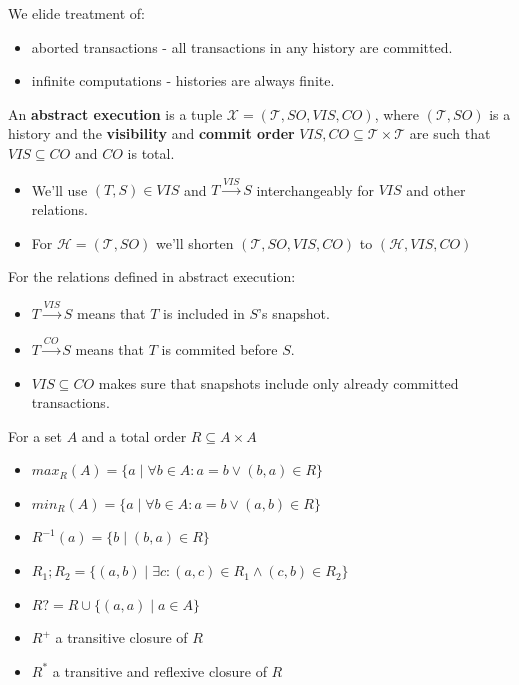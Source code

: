 \documentclass{beamer}
\begin{document}
\begin{frame}
	We elide treatment of:
	\begin{itemize}
		\item aborted transactions - all transactions in any history are committed.
		\item infinite computations - histories are always finite.
	\end{itemize}
\end{frame}

\begin{frame}
	An \textbf{abstract execution} is a tuple $ \mathcal{X} = (\mathcal{T}, SO, VIS, CO) $, where $(\mathcal{T}, SO)$ is a history and the \textbf{visibility} and \textbf{commit order} $ VIS, CO \subseteq \mathcal{T} \times \mathcal{T} $ are such that $ VIS \subseteq CO $ and $CO$ is total.
\end{frame}

\begin{frame}
	\begin{itemize}
		\item We'll use $ (T, S) \in VIS$ and $ T \overset{VIS}{\longrightarrow} S $ interchangeably for $VIS$ and other relations.
		\item For $\mathcal{H}=(\mathcal{T}, SO)$ we'll shorten $(\mathcal{T}, SO, VIS, CO)$ to $(\mathcal{H}, VIS, CO)$
	\end{itemize}
\end{frame}

\begin{frame}
	For the relations defined in abstract execution:
	\begin{itemize}
		\item $ T \overset{VIS}{\longrightarrow} S $ means that $T$ is included in $S$'s snapshot.
		\item $ T \overset{CO}{\longrightarrow} S $ means that $T$ is commited before $S$.
		\item $ VIS \subseteq CO $ makes sure that snapshots include only already committed transactions.
	\end{itemize}
\end{frame}

\begin{frame}
	For a set $ A $ and a total order $ R \subseteq A \times A $
	\begin{itemize}
		\item $max_R(A) = \{ a \mid \forall b \in A: a = b \vee (b, a) \in R \} $
		\item $min_R(A) = \{ a \mid \forall b \in A: a = b \vee (a, b) \in R \} $
		\item $R^{-1}(a) = \{ b \mid  (b, a) \in R\} $
		\item $R_1;R_2 = \{(a,b) \mid \exists c: (a,c) \in R_1 \wedge (c,b) \in R_2\} $
		\item $R? = R \cup \{ (a, a) \mid a \in A \}$
		\item $R^+$ a transitive closure of $R$
		\item $R^*$ a transitive and reflexive closure of $R$
	\end{itemize}
\end{frame}
\end{document}
